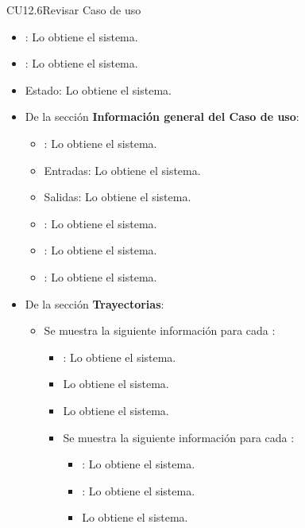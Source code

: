 \begin{UseCase}{CU12.6}{Revisar Caso de uso}
{\begin{itemize}
				\item {}: Lo obtiene el sistema.
				\item {}: Lo obtiene el sistema.
				\item Estado: Lo obtiene el sistema.
				\item De la sección \textbf{Información general del Caso de uso}: 
					\begin{itemize}
						\item {}: Lo obtiene el sistema.
						\item Entradas: Lo obtiene el sistema.
						\item Salidas: Lo obtiene el sistema.
						\item {}: Lo obtiene el sistema.
						\item {}: Lo obtiene el sistema.
						\item {}: Lo obtiene el sistema.
					\end{itemize}
				\item De la sección \textbf{Trayectorias}:
					\begin{itemize}
						\item Se muestra la siguiente información para cada :
							\begin{itemize}
								\item {}: Lo obtiene el sistema.
								\item {} Lo obtiene el sistema.
								\item {} Lo obtiene el sistema.
								\item Se muestra la siguiente información para cada :
									\begin{itemize}
										\item {}: Lo obtiene el sistema.
										\item {}: Lo obtiene el sistema.
										\item {} Lo obtiene el sistema.
									\end{itemize}

\end{itemize}
\end{itemize}
\end{itemize}}
\end{UseCase}
